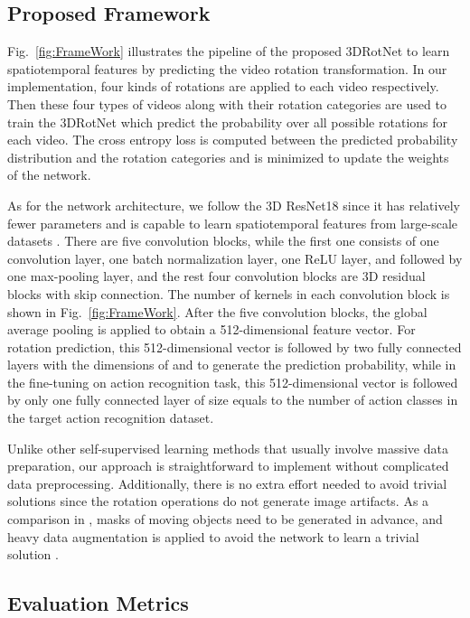 \documentclass[10pt,twocolumn,letterpaper]{article}
\begin{document}
\subsection{Proposed Framework}

Fig.~\ref{fig:FrameWork} illustrates the pipeline of the proposed 3DRotNet to learn spatiotemporal features by predicting the video rotation transformation. In our implementation, four kinds of rotations  are applied to each video respectively. Then these four types of videos along with their rotation categories  are used to train the 3DRotNet which predict the probability over all possible rotations for each video. The cross entropy loss is computed between the predicted probability distribution  and the rotation categories  and is minimized to update the weights of the network. 

As for the network architecture, we follow the 3D ResNet18 since it has relatively fewer parameters and is capable to learn spatiotemporal features from large-scale datasets \cite{3DResNet}. There are five convolution blocks, while the first one consists of one convolution layer, one batch normalization layer, one ReLU layer, and followed by one max-pooling layer, and the rest four convolution blocks are 3D residual blocks with skip connection. The number of kernels in each convolution block is shown in Fig.~\ref{fig:FrameWork}. After the five convolution blocks, the global average pooling is applied to obtain a 512-dimensional feature vector. For rotation prediction, this 512-dimensional vector is followed by two fully connected layers with the dimensions of  and  to generate the prediction probability, while in the fine-tuning on action recognition task, this 512-dimensional vector is followed by only one fully connected layer of size equals to the number of action classes in the target action recognition dataset.

Unlike other self-supervised learning methods \cite{shuffleandlearn, jigsaw, watchingmove} that usually involve massive data preparation, our approach is straightforward to implement without complicated data preprocessing. Additionally, there is no extra effort needed to avoid trivial solutions since the rotation operations do not generate image artifacts. As a comparison in \cite{watchingmove}, masks of moving objects need to be generated in advance, and heavy data augmentation is applied to avoid the network to learn a trivial solution \cite{contextprediction}. 

\subsection{Evaluation Metrics}
\end{document}
